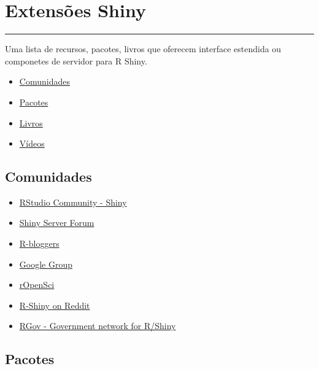 \documentclass[
]{book}
\providecommand{\tightlist}{%
  \setlength{\itemsep}{0pt}\setlength{\parskip}{0pt}}
\begin{document}
\hypertarget{extensuxf5es-shiny}{%
\chapter{\texorpdfstring{\textbf{Extensões Shiny}}{Extensões Shiny}}\label{extensuxf5es-shiny}}

\begin{center}\rule{0.5\linewidth}{0.5pt}\end{center}

Uma lista de recursos, pacotes, livros que oferecem interface estendida ou componetes de servidor para R Shiny.

\begin{itemize}
\tightlist
\item
  \protect\hyperlink{comunidades}{Comunidades}
\item
  \protect\hyperlink{pacotes}{Pacotes}
\item
  \protect\hyperlink{livros}{Livros}
\item
  \protect\hyperlink{vuxeddeos}{Vídeos}
\end{itemize}

\hypertarget{comunidades}{%
\section{\texorpdfstring{\textbf{Comunidades}}{Comunidades}}\label{comunidades}}

\begin{itemize}
\tightlist
\item
  \href{https://community.rstudio.com/latest}{RStudio Community - Shiny}
\item
  \href{https://support.rstudio.com/hc/en-us/sections/204025308-Shiny-Server}{Shiny Server Forum}
\item
  \href{https://www.r-bloggers.com/2020/05/powerful-package-for-machine-learning-hyperparameter-tuning-grid-random-search-shiny-app/}{R-bloggers}
\item
  \href{https://groups.google.com/g/shiny-discuss?pli=1}{Google Group}
\item
  \href{https://ropensci.org/}{rOpenSci}
\item
  \href{https://www.reddit.com/r/rshiny/}{R-Shiny on Reddit}
\item
  \href{https://rdotgov.wordpress.com/deploy-shiny/}{RGov - Government network for R/Shiny}
\end{itemize}

\hypertarget{pacotes}{%
\section{\texorpdfstring{\textbf{Pacotes}}{Pacotes}}\label{pacotes}}
\end{document}

